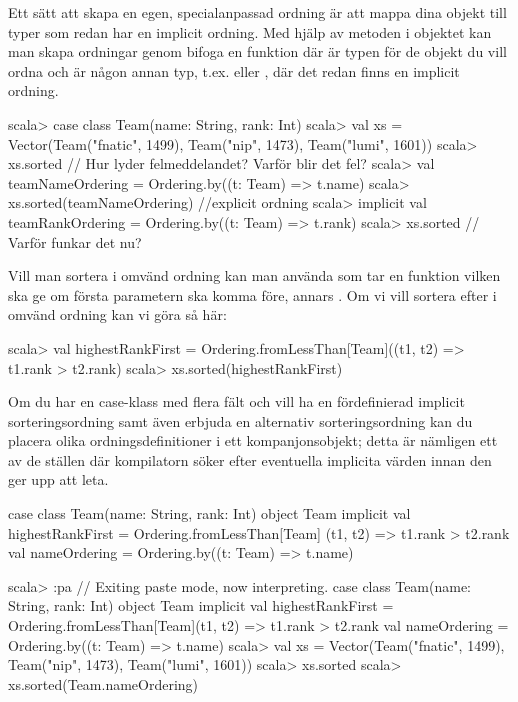 \Subtask Ett sätt att skapa en egen, specialanpassad ordning är att mappa dina objekt till typer som redan har en implicit ordning. Med hjälp av metoden  i objektet  kan man skapa ordningar genom bifoga en funktion  där  är typen för de objekt du vill ordna och  är någon annan typ, t.ex.  eller , där det redan finns en implicit ordning.
\begin{REPL}
scala> case class Team(name: String, rank: Int)
scala> val xs = 
         Vector(Team("fnatic", 1499), Team("nip", 1473), Team("lumi", 1601))
scala> xs.sorted  // Hur lyder felmeddelandet? Varför blir det fel?
scala> val teamNameOrdering = Ordering.by((t: Team) => t.name)
scala> xs.sorted(teamNameOrdering)   //explicit ordning
scala> implicit val teamRankOrdering = Ordering.by((t: Team) => t.rank)
scala> xs.sorted   // Varför funkar det nu?
\end{REPL}

\Subtask Vill man sortera i omvänd ordning kan man använda 
 som tar en funktion  vilken ska ge  om första parametern ska komma före, annars . Om vi vill sortera efter  i omvänd ordning kan vi göra så här:
\begin{REPL}
scala> val highestRankFirst = 
         Ordering.fromLessThan[Team]((t1, t2) => t1.rank > t2.rank)
scala> xs.sorted(highestRankFirst)
\end{REPL}

\Subtask Om du har en case-klass med flera fält och vill ha en fördefinierad implicit sorteringsordning samt även erbjuda en alternativ sorteringsordning kan du placera olika ordningsdefinitioner i ett kompanjonsobjekt; detta är nämligen ett av de ställen där kompilatorn söker efter eventuella implicita värden innan den ger upp att leta. 
\begin{Code}
case class  Team(name: String, rank: Int)
object Team {
  implicit val highestRankFirst = Ordering.fromLessThan[Team]{
    (t1, t2) => t1.rank > t2.rank
  }
  val nameOrdering = Ordering.by((t: Team) => t.name)
}
\end{Code}
\begin{REPL}
scala> :pa
// Exiting paste mode, now interpreting.
case class  Team(name: String, rank: Int)
object Team {
  implicit val highestRankFirst = 
    Ordering.fromLessThan[Team]{(t1, t2) => t1.rank > t2.rank}
  val nameOrdering = Ordering.by((t: Team) => t.name)
}
scala> val xs = 
         Vector(Team("fnatic", 1499), Team("nip", 1473), Team("lumi", 1601))
scala> xs.sorted
scala> xs.sorted(Team.nameOrdering)
\end{REPL}



